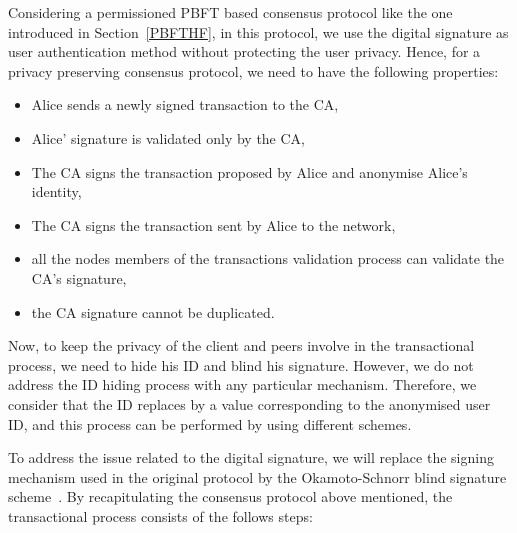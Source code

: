 \documentclass[conference]{IEEEtran}
\begin{document}
Considering a permissioned PBFT based consensus protocol like the one introduced in Section~\ref{PBFTHF}, in this protocol, we use the digital signature as user authentication method without protecting the user privacy. Hence, for a privacy preserving consensus protocol, we need to have the following properties:

\begin{itemize}
    \item Alice sends a newly signed transaction to the CA,
    \item Alice’ signature is validated only by the CA,
    \item The CA signs the transaction proposed by Alice and anonymise Alice’s identity,
    \item The CA signs the transaction sent by Alice to the network,
    \item all the nodes members of the transactions validation process can validate the CA's signature,
    \item the CA signature cannot be duplicated.
\end{itemize}

Now, to keep the privacy of the client and peers involve in the transactional process, we need to hide his ID and blind his signature. However, we do not address the ID hiding process with any particular mechanism. Therefore, we consider that the ID  replaces by a value corresponding to the anonymised user ID, and this process can be performed by using different schemes.

To address the issue related to the digital signature, we will replace the signing mechanism used in the original protocol by the Okamoto-Schnorr blind signature scheme~\cite{okamoto1992provably}. By recapitulating the consensus protocol above mentioned, the transactional process consists of the follows steps:
\end{document}
